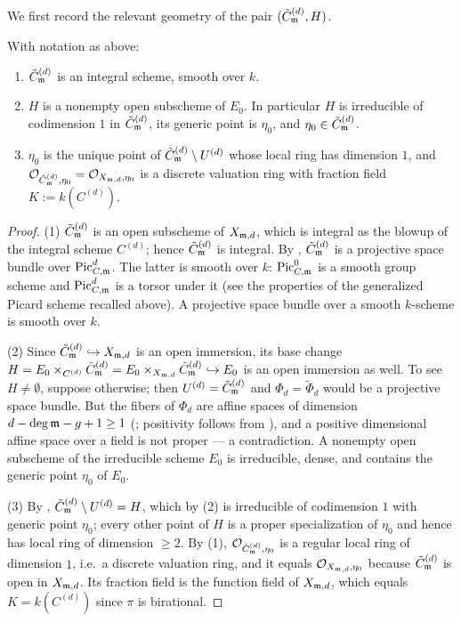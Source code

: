 We first record the relevant geometry of the pair $(\Cmod{d}, H)$.

\begin{lemma}\label{lemma:boundary_of_compactification}
    With notation as above:
    \begin{enumerate}
        \item $\Cmod{d}$ is an integral scheme, smooth over $k$.
        \item $H$ is a nonempty open subscheme of $E_0$. In particular $H$ is irreducible of
              codimension $1$ in $\Cmod{d}$, its generic point is $\eta_0$, and $\eta_0 \in \Cmod{d}$.
        \item $\eta_0$ is the unique point of $\Cmod{d} \setminus U^{(d)}$ whose local ring has dimension $1$,
              and $\Oo_{\Cmod{d}, \eta_0} = \Oo_{X_{\mdls,d}, \eta_0}$ is a discrete valuation ring
              with fraction field $K := k(C^{(d)})$.
    \end{enumerate}
\end{lemma}
\begin{proof}
    (1) $\Cmod{d}$ is an open subscheme of $X_{\mdls,d}$, which is integral as the blowup of the
    integral scheme $C^{(d)}$; hence $\Cmod{d}$ is integral.
    By , $\Cmod{d}$ is a projective space bundle over
    $\PicCm[d]$. The latter is smooth over $k$: $\PicCm[0]$ is a smooth group scheme and $\PicCm[d]$
    is a torsor under it (see the properties of the generalized Picard scheme recalled above).
    A projective space bundle over a smooth $k$-scheme is smooth over $k$.

    (2) Since $\Cmod{d} \hookrightarrow X_{\mdls,d}$ is an open immersion, its base change
    $H = E_0 \times_{C^{(d)}} \Cmod{d} = E_0 \times_{X_{\mdls,d}} \Cmod{d} \hookrightarrow E_0$
    is an open immersion as well. To see $H \neq \emptyset$, suppose otherwise; then
    $U^{(d)} = \Cmod{d}$ and $\Phi_d = \tilde{\Phi}_d$ would be a projective space bundle. But the
    fibers of $\Phi_d$ are affine spaces of dimension $d - \deg \mdls - g + 1 \geq 1$
    (; positivity follows from ),
    and a positive dimensional affine space over a field is not proper --- a contradiction.
    A nonempty open subscheme of the irreducible scheme $E_0$ is irreducible, dense, and contains the
    generic point $\eta_0$ of $E_0$.

    (3) By , $\Cmod{d} \setminus U^{(d)} = H$,
    which by (2) is irreducible of codimension $1$ with generic point $\eta_0$; every other point of $H$
    is a proper specialization of $\eta_0$ and hence has local ring of dimension $\geq 2$.
    By (1), $\Oo_{\Cmod{d}, \eta_0}$ is a regular local ring of dimension $1$, i.e.\ a discrete
    valuation ring, and it equals $\Oo_{X_{\mdls,d}, \eta_0}$ because $\Cmod{d}$ is open in $X_{\mdls,d}$.
    Its fraction field is the function field of $X_{\mdls,d}$, which equals $K = k(C^{(d)})$
    since $\pi$ is birational.
\end{proof}

